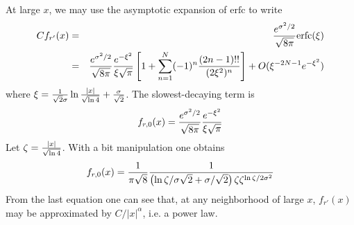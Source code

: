 At large $x$, we may use the asymptotic expansion of $\mathrm{erfc}$
to write
\begin{eqnarray*}
  Cf_{r'}(x) &=& {e^{\sigma^2 / 2} \over \sqrt{8\pi}} \mathrm{erfc}(\xi) \\
  &=& {e^{\sigma^2 / 2} \over \sqrt{8 \pi}}
  \frac{e^{-\xi^2}}{\xi\sqrt{\pi}}\left[
    1 +
    \sum_{n=1}^N (-1)^n \frac{(2n-1)!!}{(2\xi^2)^n} \right] +
  O(\xi^{-2N-1} e^{-\xi^2})
\end{eqnarray*}
where $\xi = {1 \over \sqrt{2}\sigma} \ln{|x| \over \sqrt{\ln 4}} +
{\sigma \over \sqrt{2}}$. The slowest-decaying term is
\[
f_{r,0}(x) = {e^{\sigma^2 / 2} \over \sqrt{8\pi}}
\frac{e^{-\xi^2}}{\xi\sqrt{\pi}}
\]
Let $\zeta = {|x| \over \sqrt{\ln 4}}$. With a bit manipulation one
obtains
\begin{equation*}
  f_{r,0}(x) = {1 \over \pi \sqrt{8}}{1 \over
    \left(\ln\zeta/\sigma\sqrt{2} +
      \sigma/\sqrt{2}\right)\zeta\zeta^{\ln \zeta / 2\sigma^2}
  }
\end{equation*}
From the last equation one can see that, at any neighborhood of large
$x$, $f_{r'}(x)$ may be approximated by $C/|x|^\alpha$, i.e. a power law.

